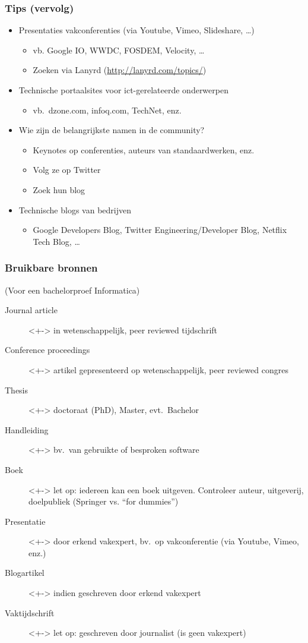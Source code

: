 \documentclass[aspectratio=169]{beamer}
\begin{document}
\begin{frame}
  \frametitle{Tips (vervolg)}

  \begin{itemize}
    \item Presentaties vakconferenties (via Youtube, Vimeo, Slideshare, \dots)
      \begin{itemize}
        \item vb. Google IO, WWDC, FOSDEM, Velocity, \dots
        \item Zoeken via Lanyrd (\url{http://lanyrd.com/topics/})
      \end{itemize}
    \item<+-> Technische portaalsites voor ict-gerelateerde onderwerpen
      \begin{itemize}
        \item vb.~dzone.com, infoq.com, TechNet, enz.
      \end{itemize}
    \item<+-> Wie zijn de belangrijkste namen in de community?
      \begin{itemize}
        \item Keynotes op conferenties, auteurs van standaardwerken, enz.
        \item Volg ze op Twitter
        \item Zoek hun blog
      \end{itemize}
    \item<+-> Technische blogs van bedrijven
      \begin{itemize}
        \item Google Developers Blog, Twitter Engineering/Developer Blog, Netflix Tech Blog, \dots
      \end{itemize}
  \end{itemize}
\end{frame}


\begin{frame}
  \frametitle{Bruikbare bronnen}

  (Voor een bachelorproef Informatica)

  \begin{description}
    \item[Journal article]<+-> in wetenschappelijk, peer reviewed tijdschrift
    \item[Conference proceedings]<+-> artikel gepresenteerd op wetenschappelijk, peer reviewed congres
    \item[Thesis]<+-> doctoraat (PhD), Master, evt.~Bachelor
    \item[Handleiding]<+-> bv.~van gebruikte of besproken software
    \item[Boek]<+-> let op: iedereen kan een boek uitgeven. Controleer auteur, uitgeverij, doelpubliek (Springer vs. ``for dummies'')
    \item[Presentatie]<+-> door erkend vakexpert, bv.~op vakconferentie (via Youtube, Vimeo, enz.)
    \item[Blogartikel]<+-> indien geschreven door erkend vakexpert
    \item[Vaktijdschrift]<+-> let op: geschreven door journalist (is geen vakexpert)
  \end{description}
\end{frame}
\end{document}
